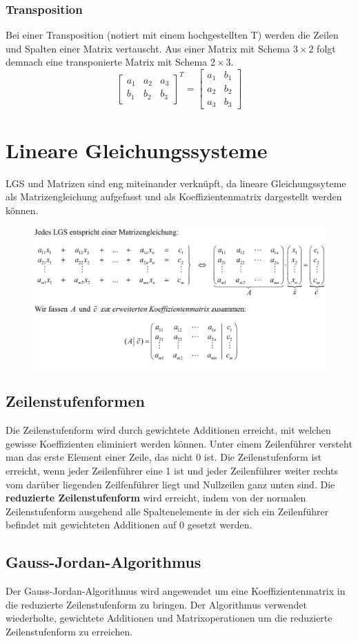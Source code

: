 \documentclass{article}
\begin{document}
\subsubsection{Transposition}
Bei einer Transposition (notiert mit einem hochgestellten T) werden die Zeilen und Spalten einer Matrix vertauscht. Aus einer Matrix mit Schema $3\times 2$ folgt demnach eine transponierte Matrix mit Schema $2\times 3$.
$$
\begin{bmatrix}
		a_1 & a_2 & a_3\\
		b_1 & b_2 & b_3
\end{bmatrix}^{T}
=
\begin{bmatrix}
a_1 & b_1 \\
a_2 & b_2 \\
a_3 & b_3
\end{bmatrix}
$$
\section{Lineare Gleichungssysteme}
LGS und Matrizen sind eng miteinander verknüpft, da lineare Gleichungssyteme als Matrizengleichung aufgefasst und als Koeffizientenmatrix dargestellt werden können.
\begin{figure}[h]
		\includegraphics[width=\linewidth]{img/lgs.png}
\end{figure}
\subsection{Zeilenstufenformen}
Die Zeilenstufenform wird durch gewichtete Additionen erreicht, mit welchen gewisse Koeffizienten eliminiert werden können. Unter einem Zeilenführer versteht man das erste Element einer Zeile, das nicht 0 ist. Die Zeilenstufenform ist erreicht, wenn jeder Zeilenführer eine 1 ist und jeder Zeilenführer weiter rechts vom darüber liegenden Zeilfenführer liegt und Nullzeilen ganz unten sind. Die \textbf{reduzierte Zeilenstufenform} wird erreicht, indem von der normalen Zeilenstufenform ausgehend alle Spaltenelemente in der sich ein Zeilenführer befindet mit gewichteten Additionen auf 0 gesetzt werden.

\subsection{Gauss-Jordan-Algorithmus}
Der Gauss-Jordan-Algorithmus wird angewendet um eine Koeffizientenmatrix in die reduzierte Zeilenstufenform zu bringen. Der Algorithmus verwendet wiederholte, gewichtete Additionen und Matrixoperationen um die reduzierte Zeilenstufenform zu erreichen.
\end{document}
